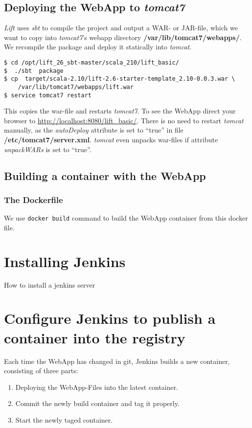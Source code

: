 \documentclass[11pt]{article}
\begin{document}
\subsection{Deploying the WebApp to \emph{tomcat7}}
\label{sec-3-3}

\emph{Lift} uses \emph{sbt} to compile the project and output a WAR- or JAR-file, which we want to copy into \emph{tomcat7}'s webapp directory \textbf{/var/lib/tomcat7/webapps/}. We recompile the package and deploy it statically into \emph{tomcat}.

\begin{verbatim}
$ cd /opt/lift_26_sbt-master/scala_210/lift_basic/
$  ./sbt  package
$ cp  target/scala-2.10/lift-2.6-starter-template_2.10-0.0.3.war \
    /var/lib/tomcat7/webapps/lift.war
$ service tomcat7 restart
\end{verbatim}
This copies the war-file and restarts \emph{tomcat7}. To see the WebApp direct your browser to \href{http://localhost:8080/lift_basic/}{http://localhost:8080/lift\_basic/}. There is no need to restart \emph{tomcat} manually, as the \emph{autoDeploy} attribute is set to ``true'' in file \textbf{/etc/tomcat7/server.xml}. \emph{tomcat} even unpacks war-files if attribute \emph{unpackWARs} is set to ``true''.
\subsection{Building a container with the WebApp}
\label{sec-3-4}
\subsubsection{The Dockerfile}
\label{sec-3-4-1}

We use \texttt{docker build} command to build the WebApp container from this docker file.
\section{Installing Jenkins}
\label{sec-4}

How to install a jenkins server
\section{Configure Jenkins to publish a container into the registry}
\label{sec-5}


Each time the WebApp has changed in git, Jenkins builds a new container,  consisting of three parts:
\begin{enumerate}
\item Deploying the WebApp-Files into the latest container.
\item Commit the newly build container and tag it properly.
\item Start the newly taged container.
\end{enumerate}
\end{document}
